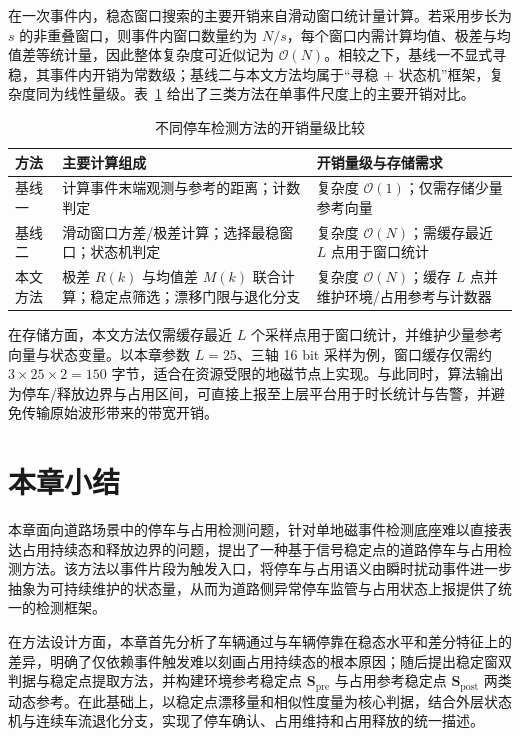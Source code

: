 \documentclass{xdupgthesis}
\begin{document}
在一次事件内，稳态窗口搜索的主要开销来自滑动窗口统计量计算。若采用步长为 $s$ 的非重叠窗口，则事件内窗口数量约为 $N/s$，每个窗口内需计算均值、极差与均值差等统计量，因此整体复杂度可近似记为 $\mathcal{O}(N)$。相较之下，基线一不显式寻稳，其事件内开销为常数级；基线二与本文方法均属于“寻稳 + 状态机”框架，复杂度同为线性量级。表~\ref{tab:ch4_complexity} 给出了三类方法在单事件尺度上的主要开销对比。

\begin{table}[!htbp]
\centering
\small
\caption{不同停车检测方法的开销量级比较}
\label{tab:ch4_complexity}
\setlength{\tabcolsep}{6pt}
\renewcommand{\arraystretch}{1.18}
\begin{tabular}{p{2.2cm} p{6.6cm} p{5.4cm}}
\hline
方法 & 主要计算组成 & 开销量级与存储需求 \\
\hline
基线一 & 计算事件末端观测与参考的距离；计数判定 & 复杂度 $\mathcal{O}(1)$；仅需存储少量参考向量 \\
基线二 & 滑动窗口方差/极差计算；选择最稳窗口；状态机判定 & 复杂度 $\mathcal{O}(N)$；需缓存最近 $L$ 点用于窗口统计 \\
本文方法 & 极差 $R(k)$ 与均值差 $M(k)$ 联合计算；稳定点筛选；漂移门限与退化分支 & 复杂度 $\mathcal{O}(N)$；缓存 $L$ 点并维护环境/占用参考与计数器 \\
\hline
\end{tabular}
\end{table}

在存储方面，本文方法仅需缓存最近 $L$ 个采样点用于窗口统计，并维护少量参考向量与状态变量。以本章参数 $L=25$、三轴 16 bit 采样为例，窗口缓存仅需约 $3\times 25\times 2=150$ 字节，适合在资源受限的地磁节点上实现。与此同时，算法输出为停车/释放边界与占用区间，可直接上报至上层平台用于时长统计与告警，并避免传输原始波形带来的带宽开销。

\section{本章小结}
\label{sec:ch4_summary}

本章面向道路场景中的停车与占用检测问题，针对单地磁事件检测底座难以直接表达占用持续态和释放边界的问题，提出了一种基于信号稳定点的道路停车与占用检测方法。该方法以事件片段为触发入口，将停车与占用语义由瞬时扰动事件进一步抽象为可持续维护的状态量，从而为道路侧异常停车监管与占用状态上报提供了统一的检测框架。

在方法设计方面，本章首先分析了车辆通过与车辆停靠在稳态水平和差分特征上的差异，明确了仅依赖事件触发难以刻画占用持续态的根本原因；随后提出稳定窗双判据与稳定点提取方法，并构建环境参考稳定点 $\mathbf{S}_{\mathrm{pre}}$ 与占用参考稳定点 $\mathbf{S}_{\mathrm{post}}$ 两类动态参考。在此基础上，以稳定点漂移量和相似性度量为核心判据，结合外层状态机与连续车流退化分支，实现了停车确认、占用维持和占用释放的统一描述。
\end{document}
